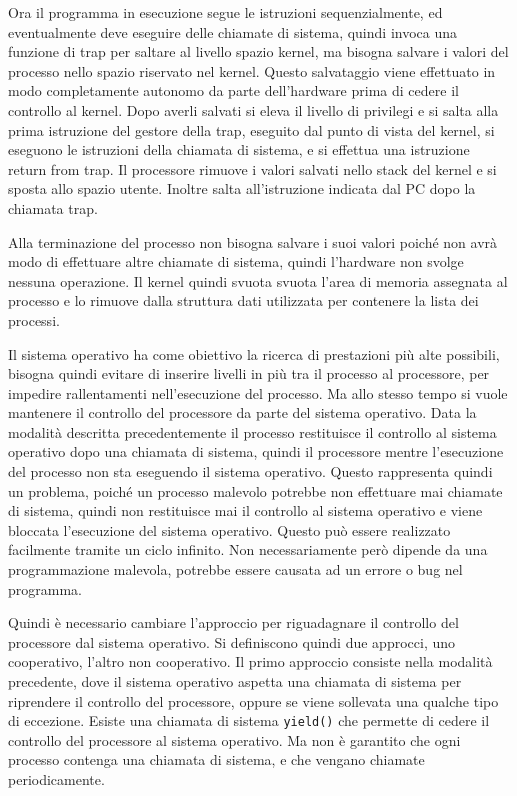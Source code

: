 \documentclass{article}
\numberwithin{equation}{subsection}
\begin{document}
Ora il programma in esecuzione segue le istruzioni sequenzialmente, ed eventualmente deve eseguire delle chiamate di sistema, quindi invoca una funzione di trap per 
saltare al livello spazio kernel, ma bisogna salvare i valori del processo nello spazio riservato nel kernel. Questo salvataggio viene effettuato in modo completamente autonomo 
da parte dell'hardware prima di cedere il controllo al kernel. Dopo averli salvati si eleva il livello di privilegi e si salta alla prima istruzione del gestore della trap, 
eseguito dal punto di vista del kernel, si eseguono le istruzioni della chiamata di sistema, e si effettua una istruzione return from trap. 
Il processore rimuove i valori salvati nello stack del kernel e si sposta allo spazio utente. Inoltre salta all'istruzione indicata dal PC dopo la chiamata trap. 

Alla terminazione del processo non bisogna salvare i suoi valori poiché non avrà modo di effettuare altre chiamate di sistema, quindi l'hardware non svolge nessuna 
operazione. Il kernel quindi svuota svuota l'area di memoria assegnata al processo e lo rimuove dalla struttura dati utilizzata per contenere la lista dei processi. 

Il sistema operativo ha come obiettivo la ricerca di prestazioni più alte possibili, bisogna quindi evitare di inserire livelli in più tra il processo al processore, per 
impedire rallentamenti nell'esecuzione del processo. Ma allo stesso tempo si vuole mantenere il controllo del processore da parte del sistema operativo. 
Data la modalità descritta precedentemente il processo restituisce il controllo al sistema operativo dopo una chiamata di sistema, quindi il processore mentre l'esecuzione del 
processo non sta eseguendo il sistema operativo. Questo rappresenta quindi un problema, poiché un processo malevolo potrebbe non effettuare mai chiamate di sistema, quindi 
non restituisce mai il controllo al sistema operativo e viene bloccata l'esecuzione del sistema operativo. Questo può essere realizzato facilmente tramite un ciclo 
infinito. Non necessariamente però dipende da una programmazione malevola, potrebbe essere causata ad un errore o bug nel programma. 

Quindi è necessario cambiare l'approccio per riguadagnare il controllo del processore dal sistema operativo. Si definiscono quindi due approcci, uno cooperativo, l'altro 
non cooperativo. Il primo approccio consiste nella modalità precedente, dove il sistema operativo aspetta una chiamata di sistema per riprendere il controllo del processore, 
oppure se viene sollevata una qualche tipo di eccezione. 
Esiste una chiamata di sistema \verb|yield()| che permette di cedere il controllo del processore al sistema operativo. Ma non è garantito che ogni processo contenga 
una chiamata di sistema, e che vengano chiamate periodicamente. 
\end{document}
